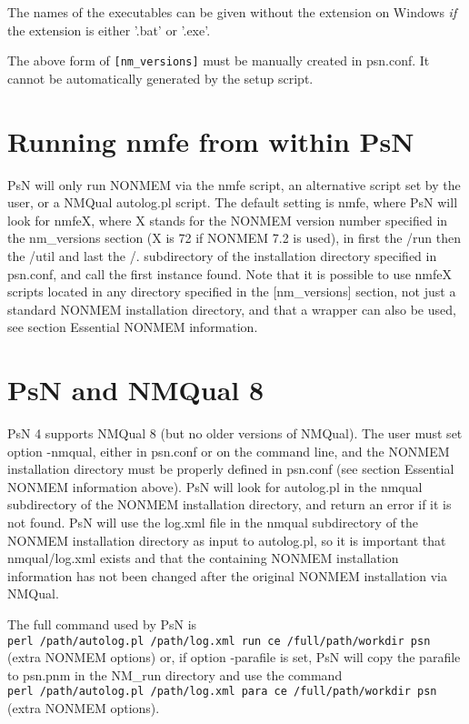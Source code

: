The names of the executables can be given without the extension on Windows \emph{if} the extension is either '.bat' or '.exe'. 

The above form of \verb|[nm_versions]| must be manually created in psn.conf. It cannot be automatically generated by the setup script.

\section{Running nmfe from within PsN}

PsN will only run NONMEM via the nmfe script, an alternative script set by the user, or a NMQual autolog.pl script. 
The default setting is nmfe, where PsN will look for nmfeX, where X stands for the NONMEM version number specified in the nm\_versions section (X is 72 if NONMEM 7.2 is used), in first the /run then the /util and last the /. subdirectory of the installation directory specified in psn.conf, and call the first instance found. Note that it is possible to use nmfeX scripts located in any directory specified in the [nm\_versions] section, not just a standard NONMEM installation directory, and that a wrapper can also be used, see section Essential NONMEM information.

\section{PsN and NMQual 8}

PsN 4 supports NMQual 8 (but no older versions of NMQual). The user must set option -nmqual, either in psn.conf or on the command line, and the NONMEM installation directory must be properly defined in psn.conf (see section Essential NONMEM information above). PsN will look for autolog.pl in the nmqual subdirectory of the NONMEM installation directory, and return an error if it is not found.
PsN will use the log.xml file in the nmqual subdirectory of the NONMEM installation directory as input to autolog.pl, so it is important that nmqual/log.xml exists and that the containing NONMEM installation information has not been changed after the original NONMEM installation via NMQual.

\noindent The full command used by PsN is\\
\verb|perl /path/autolog.pl /path/log.xml run ce /full/path/workdir psn| (extra NONMEM options)
\noindent or, if option -parafile is set, PsN will copy the parafile to psn.pnm in the NM\_run directory and use the command\\
\verb|perl /path/autolog.pl /path/log.xml para ce /full/path/workdir psn| (extra NONMEM options).

